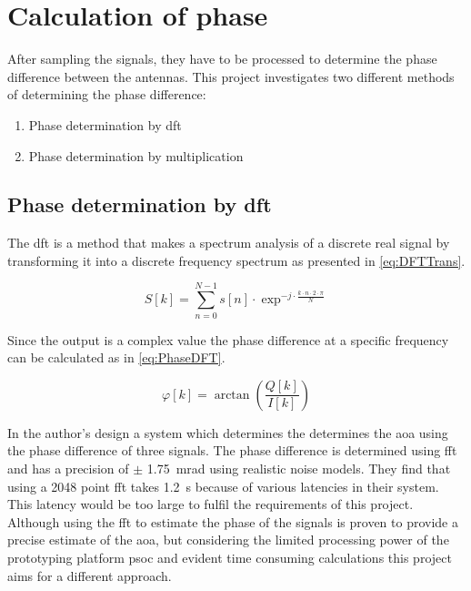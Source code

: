 \section{Calculation of phase} \label{sec:calc_of_phase}
After sampling the signals, they have to be processed to determine the phase difference between the antennas. This project investigates two different methods of determining the phase difference:

\begin{enumerate}
	\item Phase determination by \gls{dft}
	\item Phase determination by multiplication
\end{enumerate}

\subsection{Phase determination by \gls{dft}}

The \gls{dft} is a method that makes a spectrum analysis of a discrete real signal by transforming it into a discrete frequency spectrum as presented in \autoref{eq:DFTTrans}.

\begin{equation}\label{eq:DFTTrans}
S[k] = \sum_{n=0}^{N-1}s[n]\cdot\exp^{-j\cdot \frac{k\cdot n\cdot 2\cdot \pi}{N}}
\end{equation}
\startexplain
{}
\stopexplain

Since the output is a complex value the phase difference at a specific frequency can be calculated as in \autoref{eq:PhaseDFT}.

\begin{equation} \label{eq:PhaseDFT}
\varphi [k]= \arctan\left(\frac{Q[k]}{I[k]}\right)
\end{equation}
\startexplain
{}
\stopexplain

In \cite{TechReport:DirectionFindingPaper} the author's design a system which determines the determines the \gls{aoa} using the phase difference of three signals. The phase difference is determined using \gls{fft} and has a precision of $\pm$ \SI{1.75}{\milli\radian} using realistic noise models. They find that using a 2048 point \gls{fft} takes \SI{1.2}{\second} because of various latencies in their system. This latency would be too large to fulfil the requirements of this project.  
Although using the \gls{fft} to estimate the phase of the signals is proven to provide a precise estimate of the \gls{aoa}, but considering the limited processing power of the prototyping platform \gls{psoc} and evident time consuming calculations this project aims for a different approach.

